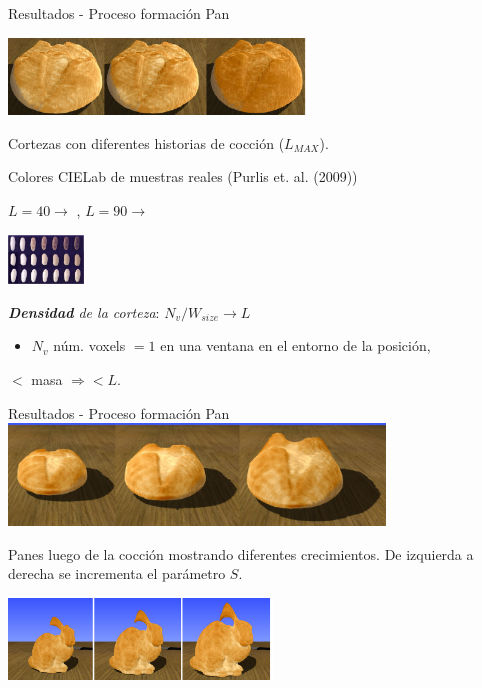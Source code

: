 \documentclass[spanish,unknownkeysallowed,10pt]{beamer}
\begin{document}
\begin{frame}{Resultados - Proceso formación Pan}

\centerline{\includegraphics[width=8cm]{../figures/Fig13}}
Cortezas con diferentes historias de cocción ($L_{MAX}$).

Colores CIELab de muestras reales (Purlis et. al. (2009))

$L = 40 \rightarrow$ , $L = 90 \rightarrow$ 

\centerline{\includegraphics[width=2cm]{../figures/browning}}

{\em \textbf{Densidad} de la corteza}: $N_{v} / W_{size} \rightarrow L$

\begin{itemize}
\item $N_{v}$ núm. voxels $= 1$ en una ventana en el entorno de la posición,
\end{itemize}

$<$ masa $\Rightarrow < L$.

\end{frame}

\begin{frame}{Resultados - Proceso formación Pan}
\includegraphics[width=10cm]{../figures/Fig14}

Panes luego de la cocción mostrando diferentes crecimientos. De izquierda a derecha se incrementa el parámetro $S$.

\includegraphics[width=7cm]{../figures/Fig15}


\end{frame}
\end{document}
